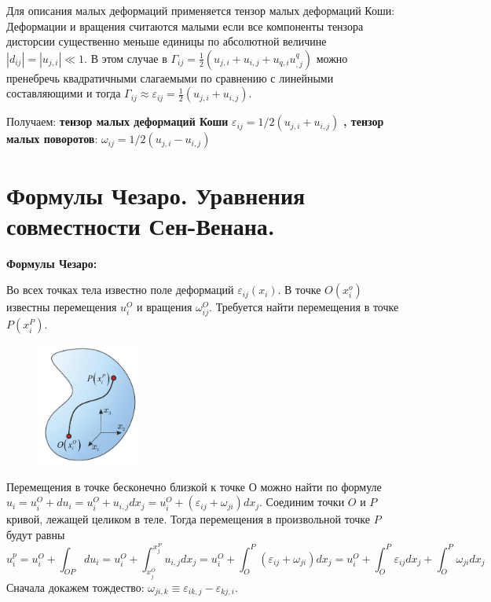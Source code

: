 Для описания малых деформаций
применяется тензор малых деформаций Коши: Деформации и вращения считаются малыми если все компоненты тензора дисторсии существенно меньше единицы по абсолютной величине $\left|d_{i j}\right|=\left|u_{j, i}\right| \ll 1$. В этом случае в $\Gamma_{i j}=\frac{1}{2}\left(u_{j, i}+u_{i, j}+u_{q, i} u_{, j}^q\right)$ можно пренебречь квадратичными слагаемыми по сравнению с линейными составляющими и тогда $\Gamma_{i j} \approx \varepsilon_{i j}=\frac{1}{2}\left(u_{j, i}+u_{i, j}\right)$. 


Получаем: \textbf{тензор малых деформаций Коши} $\varepsilon_{i j}=1 / 2\left(u_{j, i}+u_{i, j}\right)$ 
\textbf{, тензор малых поворотов}: $\omega_{i j}=1 / 2\left(u_{j, i}-u_{i, j}\right)$


\section{Формулы Чезаро. Уравнения совместности Сен-Венана.}
\textbf{Формулы Чезаро:}


Во всех точках тела известно поле деформаций $\varepsilon_{i j}\left(x_i\right)$. В точке $O\left(x_i^o\right)$ известны перемещения $u_i^O$ и вращения $\omega_{i j}^O$. Требуется найти перемещения в точке $P\left(x_i^P\right)$. 

\begin{figure}[h!]
  \centering
  \includegraphics[width=0.3\textwidth]{images/11.1.jpg} 
\end{figure}


Перемещения в точке бесконечно близкой к точке О можно найти по формуле $u_i=u_i^O+d u_i=u_i^O+u_{i, j} d x_j=u_i^O+\left(\varepsilon_{i j}+\omega_{j i}\right) d x_j$. Соединим точки $O$ и $P$ кривой, лежащей целиком в теле. Тогда перемещения в произвольной точке $P$ будут равны
$$
u_i^p=u_i^O+\int_{O P} d u_i=u_i^O+\int_{x_j^O}^{x_j^P} u_{i, j} d x_j=u_i^O+\int_O^P\left(\varepsilon_{i j}+\omega_{j i}\right) d x_j=u_i^O+\int_O^P \varepsilon_{i j} d x_j+\int_O^P \omega_{j i} d x_j
$$
Сначала докажем тождество: $\omega_{j i, k} \equiv \varepsilon_{i k, j}-\varepsilon_{k j, i}$. 


